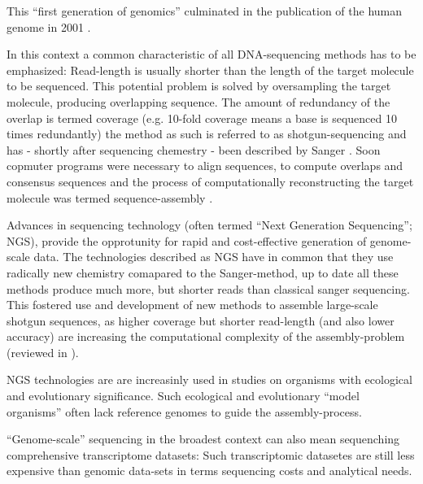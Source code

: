 This ``first generation of genomics'' culminated in the publication of
the human genome in 2001 \cite{pmid11181995}.


In this context a common characteristic of all DNA-sequencing methods
has to be emphasized: Read-length is usually shorter than the length
of the target molecule to be sequenced. This potential problem is
solved by oversampling the target molecule, producing overlapping
sequence. The amount of redundancy of the overlap is termed coverage
(e.g. 10-fold coverage means a base is sequenced 10 times redundantly)
the method as such is referred to as shotgun-sequencing and has -
shortly after sequencing chemestry - been described by Sanger
\cite{pmid6260957}. Soon copmuter programs were necessary to align
sequences, to compute overlaps and consensus sequences
\cite{pmid461197} and the process of computationally reconstructing
the target molecule was termed sequence-assembly \cite{pmid6251542}.

Advances in sequencing technology (often termed ``Next Generation
Sequencing''; NGS), provide the opprotunity for rapid and
cost-effective generation of genome-scale data. The technologies
described as NGS have in common that they use radically new chemistry
comapared to the Sanger-method, up to date all these methods produce
much more, but shorter reads than classical sanger sequencing. This
fostered use and development of new methods to assemble large-scale
shotgun sequences, as higher coverage but shorter read-length (and
also lower accuracy) are increasing the computational complexity of
the assembly-problem (reviewed in \cite{pmid20211242}).

NGS technologies are are increasinly used in studies on organisms with
ecological and evolutionary significance. Such ecological and
evolutionary ``model organisms'' often lack reference genomes to guide
the assembly-process.

``Genome-scale'' sequencing in the broadest context can also mean
sequenching comprehensive transcriptome datasets: Such transcriptomic
datasetes are still less expensive than genomic data-sets in terms
sequencing costs and analytical needs.




